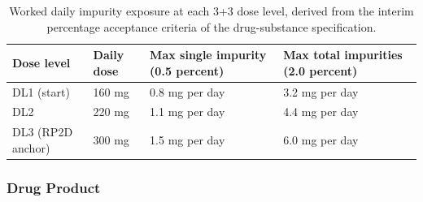 \begin{table}[t]
\centering
\caption{Worked daily impurity exposure at each 3+3 dose level, derived from the
interim percentage acceptance criteria of the drug-substance specification.}
\label{tab:cmc-impurity-exposure}
\begin{tabularx}{\textwidth}{L{2.6cm} C{2.2cm} C{3.4cm} Y}
\toprule
\textbf{Dose level} & \textbf{Daily dose} & \textbf{Max single impurity (0.5 percent)} & \textbf{Max total impurities (2.0 percent)} \\
\midrule
DL1 (start) & 160 mg & 0.8 mg per day & 3.2 mg per day \\
DL2 & 220 mg & 1.1 mg per day & 4.4 mg per day \\
DL3 (RP2D anchor) & 300 mg & 1.5 mg per day & 6.0 mg per day \\
\bottomrule
\end{tabularx}
\vspace*{-0.3cm}
\end{table}

\subsubsection{Drug Product}

